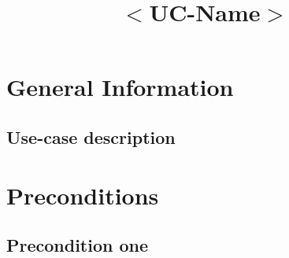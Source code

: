 \documentclass[notitlepage]{article}
\date{}
\author{}
\title{#1}
\newcommand{\name}[1]{%
   \title{#1}
   \maketitle
}
\begin{document}
   \name{$<$UC-Name$>$}

\vspace{-2cm}%

\section{General Information}
\subsection{Use-case description}

\section{Preconditions}

\subsection{Precondition one}

\end{document}
